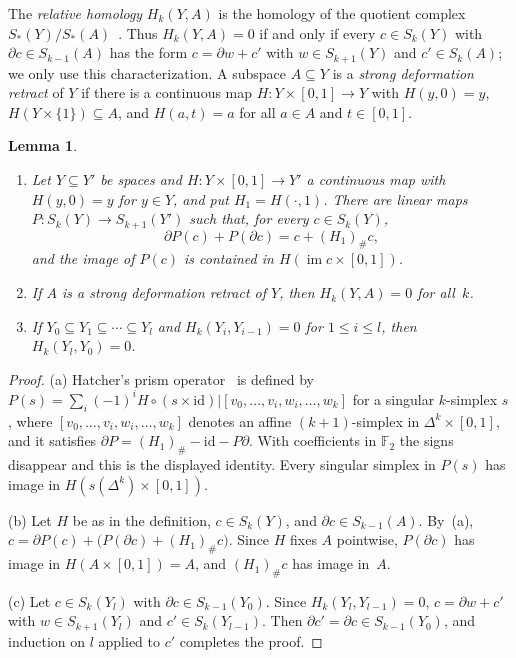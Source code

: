 \documentclass[11pt]{article}
\newtheorem{lemma}[theorem]{Lemma}
\theoremstyle{definition}
\numberwithin{equation}{section}
\newcommand{\F}{\mathbb F_2}
\DeclareMathOperator{\im}{im}
\begin{document}
The \emph{relative homology} $H_k(Y,A)$ is the homology of the quotient complex $S_\ast(Y)/S_\ast(A)$~\cite[p.~115 and p.~153]{Hatcher}. Thus $H_k(Y,A)=0$ if and only if every $c\in S_k(Y)$ with $\partial c\in S_{k-1}(A)$ has the form $c=\partial w+c'$ with $w\in S_{k+1}(Y)$ and $c'\in S_k(A)$; we only use this characterization. A subspace $A\subseteq Y$ is a \emph{strong deformation retract} of $Y$ if there is a continuous map $H:Y\times[0,1]\to Y$ with $H(y,0)=y$, $H(Y\times\{1\})\subseteq A$, and $H(a,t)=a$ for all $a\in A$ and $t\in[0,1]$.

\begin{lemma}\label{lem:prism}
\begin{enumerate}[label=\textup{(\alph*)}]
\item Let $Y\subseteq Y'$ be spaces and $H:Y\times[0,1]\to Y'$ a continuous map with $H(y,0)=y$ for $y\in Y$, and put $H_1=H(\cdot,1)$. There are linear maps $P:S_k(Y)\to S_{k+1}(Y')$ such that, for every $c\in S_k(Y)$,
\begin{equation*}
 \partial P(c)+P(\partial c)=c+(H_1)_\#c,
\end{equation*}
and the image of $P(c)$ is contained in $H(\im c\times[0,1])$.
\item If $A$ is a strong deformation retract of $Y$, then $H_k(Y,A)=0$ for all~$k$.
\item If $Y_0\subseteq Y_1\subseteq\cdots\subseteq Y_l$ and $H_k(Y_i,Y_{i-1})=0$ for $1\le i\le l$, then $H_k(Y_l,Y_0)=0$.
\end{enumerate}
\end{lemma}
\begin{proof}
(a) Hatcher's prism operator~\cite[proof of Theorem~2.10, pp.~112--113]{Hatcher} is defined by $P(s)=\sum_i(-1)^iH\circ(s\times\mathrm{id})|[v_0,\ldots,v_i,w_i,\ldots,w_k]$ for a singular $k$-simplex $s$, where $[v_0,\ldots,v_i,w_i,\ldots,w_k]$ denotes an affine $(k+1)$-simplex in $\Delta^k\times[0,1]$, and it satisfies $\partial P=(H_1)_\#-\mathrm{id}-P\partial$. With coefficients in $\F$ the signs disappear and this is the displayed identity. Every singular simplex in $P(s)$ has image in $H(s(\Delta^k)\times[0,1])$.

(b) Let $H$ be as in the definition, $c\in S_k(Y)$, and $\partial c\in S_{k-1}(A)$. By~(a), $c=\partial P(c)+\bigl(P(\partial c)+(H_1)_\#c\bigr)$. Since $H$ fixes $A$ pointwise, $P(\partial c)$ has image in $H(A\times[0,1])=A$, and $(H_1)_\#c$ has image in~$A$.

(c) Let $c\in S_k(Y_l)$ with $\partial c\in S_{k-1}(Y_0)$. Since $H_k(Y_l,Y_{l-1})=0$, $c=\partial w+c'$ with $w\in S_{k+1}(Y_l)$ and $c'\in S_k(Y_{l-1})$. Then $\partial c'=\partial c\in S_{k-1}(Y_0)$, and induction on $l$ applied to $c'$ completes the proof.
\end{proof}
\end{document}
